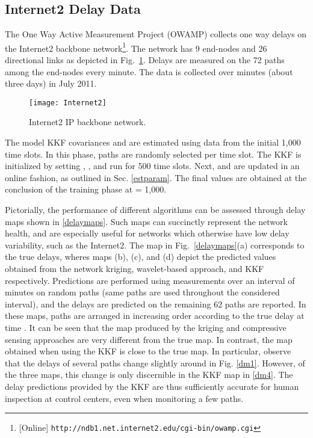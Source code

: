 \documentclass[draftcls,onecolumn,12pt]{IEEEtran}
\newlength \figwidth
\theoremstyle{plain}\newtheorem{thm}{Theorem}
\theoremstyle{definition}
\theoremstyle{remark}
\begin{document}
\subsection{Internet2 Delay Data}
The One Way Active Measurement Project (OWAMP) collects one way delays on the Internet2 backbone network\footnote{[Online] \texttt{http://ndb1.net.internet2.edu/cgi-bin/owamp.cgi}}. 
The network has 9 end-nodes and 26 directional links as depicted in Fig.~\ref{Internet2}.  Delays are measured on the 72 paths among the end-nodes every minute. The data  is collected over  minutes (about three days) in July 2011.
\begin{figure}[t]
  \centering
  \texttt{[image: Internet2]}
  \vspace{-.5cm}
  \caption{Internet2 IP backbone network.}
  \label{Internet2}
\end{figure}

The model KKF covariances  and  are estimated using data from the initial 1,000 time slots. In this phase,  paths are randomly selected per time slot. The KKF is initialized by setting , , and run for 500 time slots. Next,  and  are updated in an online fashion, as outlined in Sec. \ref{estparam}. The final values are obtained at the conclusion of the training phase at  = 1,000. 

Pictorially, the performance of different algorithms can be assessed through delay maps shown in \ref{delaymaps}. 
Such maps can succinctly represent the network health, and are especially useful for networks which otherwise have low delay variability, such as the Internet2. 
The map in Fig.~\ref{delaymaps}(a) corresponds to the true delays, wheres maps (b), (c), and (d) depict the predicted values obtained from the network kriging, wavelet-based approach, and KKF respectively. 
Predictions are performed using measurements over an interval of  minutes on  random paths (same paths are used throughout the considered interval), and the delays are predicted on the remaining 62 paths are reported. 
In these maps, paths are arranged in increasing order according to the true delay at time .
It can be seen that the map produced by the kriging and compressive sensing approaches are very different from the true map.
In contrast, the map obtained when using the KKF is close to the true map. 
In particular, observe that the delays of several paths change slightly around  in Fig. \ref{dm1}.
However, of the three maps, this change is only discernible in the KKF map in \ref{dm4}. 
The delay predictions provided by the KKF are thus sufficiently accurate for human inspection at control centers, even when monitoring a few paths. 
\end{document}
